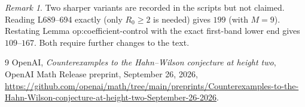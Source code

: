 \documentclass[11pt]{amsart}
\theoremstyle{remark}
\newtheorem{remark}[theorem]{Remark}
\begin{document}
\begin{remark}
Two sharper variants are recorded in the scripts but not claimed. Reading L689--694 exactly
(only $R_0\ge2$ is needed) gives $199$ (with $M=9$). Restating Lemma op:coefficient-control
with the exact first-band lower end gives $109$--$167$. Both require further changes to the text.
\end{remark}

\begin{thebibliography}{9}
 OpenAI, \emph{Counterexamples to the Hahn--Wilson conjecture at height two},
OpenAI Math Release preprint, September 26, 2026,
\url{https://github.com/openai/math/tree/main/preprints/Counterexamples-to-the-Hahn-Wilson-conjecture-at-height-two-September-26-2026}.
\end{thebibliography}
\end{document}
